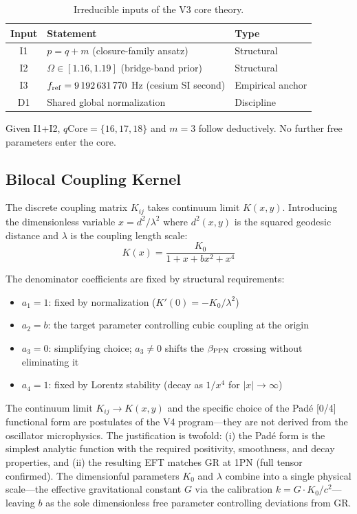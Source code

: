 \documentclass[12pt]{article}
\begin{document}
\begin{table}[h]
\centering
\begin{tabular}{c|l|l}
Input & Statement & Type \\
\midrule
I1 & $p = q + m$ (closure-family ansatz) & Structural \\
I2 & $\Omega \in [1.16, 1.19]$ (bridge-band prior) & Structural \\
I3 & $f_{\rm ref} = 9\,192\,631\,770$ Hz (cesium SI second) & Empirical anchor \\
D1 & Shared global normalization & Discipline \\
\end{tabular}
\caption{Irreducible inputs of the V3 core theory.}
\label{tab:inputs}
\end{table}

Given I1+I2, $q\text{Core} = \{16,17,18\}$ and $m=3$ follow deductively. No further free parameters enter the core.

\subsection{Bilocal Coupling Kernel}

The discrete coupling matrix $K_{ij}$ takes continuum limit $K(x,y)$. Introducing the dimensionless variable $x = d^2/\lambda^2$ where $d^2(x,y)$ is the squared geodesic distance and $\lambda$ is the coupling length scale:
\begin{equation}
K(x) = \frac{K_0}{1 + x + b x^2 + x^4}
\label{eq:kernel}
\end{equation}

The denominator coefficients are fixed by structural requirements:
\begin{itemize}
\item $a_1 = 1$: fixed by normalization ($K'(0) = -K_0/\lambda^2$)
\item $a_2 = b$: the target parameter controlling cubic coupling at the origin
\item $a_3 = 0$: simplifying choice; $a_3 \neq 0$ shifts the $\beta_{\rm PPN}$ crossing without eliminating it
\item $a_4 = 1$: fixed by Lorentz stability (decay as $1/x^4$ for $|x| \to \infty$)
\end{itemize}

The continuum limit $K_{ij} \to K(x,y)$ and the specific choice of the Pad\'e [0/4] functional form are postulates of the V4 program---they are not derived from the oscillator microphysics. The justification is twofold: (i) the Pad\'e form is the simplest analytic function with the required positivity, smoothness, and decay properties, and (ii) the resulting EFT matches GR at 1PN (full tensor confirmed). The dimensionful parameters $K_0$ and $\lambda$ combine into a single physical scale---the effective gravitational constant $G$ via the calibration $k = G\cdot K_0/c^2$---leaving $b$ as the sole dimensionless free parameter controlling deviations from GR.
\end{document}
